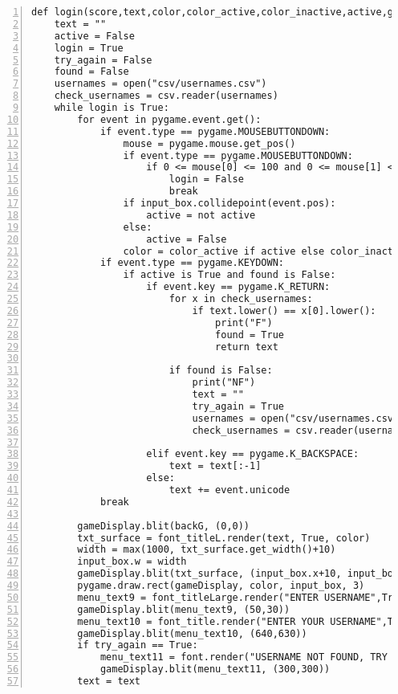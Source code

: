 \documentclass[12pt]{report}
\begin{document}
\begin{Verbatim}[numbers=left, frame=single]
def login(score,text,color,color_active,color_inactive,active,gameDisplay,fps):
    text = ""
    active = False
    login = True
    try_again = False
    found = False
    usernames = open("csv/usernames.csv")
    check_usernames = csv.reader(usernames)
    while login is True:
        for event in pygame.event.get():
            if event.type == pygame.MOUSEBUTTONDOWN:
                mouse = pygame.mouse.get_pos()
                if event.type == pygame.MOUSEBUTTONDOWN:
                    if 0 <= mouse[0] <= 100 and 0 <= mouse[1] <= 100:
                        login = False
                        break
                if input_box.collidepoint(event.pos):
                    active = not active
                else:
                    active = False
                color = color_active if active else color_inactive
            if event.type == pygame.KEYDOWN:
                if active is True and found is False:
                    if event.key == pygame.K_RETURN:
                        for x in check_usernames:
                            if text.lower() == x[0].lower():
                                print("F")
                                found = True
                                return text
                            
                        if found is False:
                            print("NF")
                            text = ""
                            try_again = True
                            usernames = open("csv/usernames.csv")
                            check_usernames = csv.reader(usernames)
                        
                    elif event.key == pygame.K_BACKSPACE:
                        text = text[:-1]
                    else:
                        text += event.unicode
            break
        
        gameDisplay.blit(backG, (0,0))
        txt_surface = font_titleL.render(text, True, color)                                        
        width = max(1000, txt_surface.get_width()+10)                                       
        input_box.w = width
        gameDisplay.blit(txt_surface, (input_box.x+10, input_box.y+5))                      
        pygame.draw.rect(gameDisplay, color, input_box, 3)
        menu_text9 = font_titleLarge.render("ENTER USERNAME",True,white)
        gameDisplay.blit(menu_text9, (50,30))
        menu_text10 = font_title.render("ENTER YOUR USERNAME",True,white)
        gameDisplay.blit(menu_text10, (640,630))
        if try_again == True:
            menu_text11 = font.render("USERNAME NOT FOUND, TRY AGAIN",True,white)
            gameDisplay.blit(menu_text11, (300,300))
        text = text
\end{Verbatim}
\end{document}
